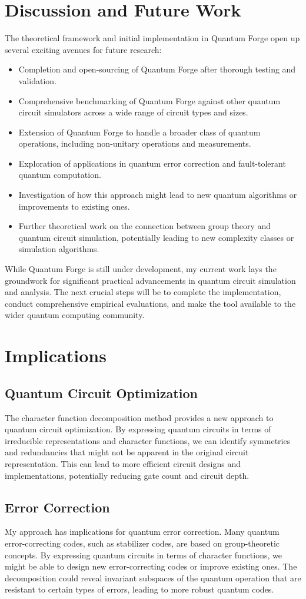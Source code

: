 \documentclass[11pt,a4paper]{article}
\begin{document}
\section{Discussion and Future Work}
The theoretical framework and initial implementation in Quantum Forge open up several exciting avenues for future research:
\begin{itemize}
\item Completion and open-sourcing of Quantum Forge after thorough testing and validation.
\item Comprehensive benchmarking of Quantum Forge against other quantum circuit simulators across a wide range of circuit types and sizes.
\item Extension of Quantum Forge to handle a broader class of quantum operations, including non-unitary operations and measurements.
\item Exploration of applications in quantum error correction and fault-tolerant quantum computation.
\item Investigation of how this approach might lead to new quantum algorithms or improvements to existing ones.
\item Further theoretical work on the connection between group theory and quantum circuit simulation, potentially leading to new complexity classes or simulation algorithms.
\end{itemize}
While Quantum Forge is still under development, my current work lays the groundwork for significant practical advancements in quantum circuit simulation and analysis. The next crucial steps will be to complete the implementation, conduct comprehensive empirical evaluations, and make the tool available to the wider quantum computing community.
\section{Implications}
\subsection{Quantum Circuit Optimization}
The character function decomposition method provides a new approach to quantum circuit optimization. By expressing quantum circuits in terms of irreducible representations and character functions, we can identify symmetries and redundancies that might not be apparent in the original circuit representation. This can lead to more efficient circuit designs and implementations, potentially reducing gate count and circuit depth\cite{Nam2018}.
\subsection{Error Correction}
My approach has implications for quantum error correction. Many quantum error-correcting codes, such as stabilizer codes, are based on group-theoretic concepts\cite{Gottesman1997}. By expressing quantum circuits in terms of character functions, we might be able to design new error-correcting codes or improve existing ones. The decomposition could reveal invariant subspaces of the quantum operation that are resistant to certain types of errors, leading to more robust quantum codes.
\end{document}
